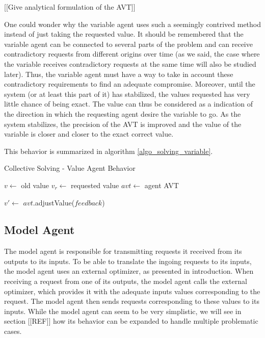 
[[Give analytical formulation of the AVT]]

One could wonder why the variable agent uses such a seemingly contrived method instead of just taking the requested value. It should be remembered that the variable agent can be connected to several parts of the problem and can receive contradictory requests from different origins over time (as we said, the case where the variable receives contradictory requests at the same time will also be studied later). Thus, the variable agent must have a way to take in account these contradictory requirements to find an adequate compromise. Moreover, until the system (or at least this part of it) has stabilized, the values requested has very little chance of being exact. The value can thus be considered as a  indication of the direction in which the requesting agent desire the variable to go. As the system stabilizes, the precision of the AVT is improved and the value of the variable is closer and closer to the exact correct value.

This behavior is summarized in algorithm \ref{algo_solving_variable}.

\begin{algorithm}
\caption{Collective Solving - Value Agent Behavior}
\label{algo_solving_variable}

	$v \leftarrow$ old value\;
	$v_r \leftarrow$ requested value\;
	$avt \leftarrow$ agent AVT \;
	
	$v' \leftarrow$ $avt$.adjustValue($feedback$)\;
	
\end{algorithm}

\subsection{Model Agent}\label{model_agent_solving}

The model agent is responsible for transmitting requests it received from its outputs to its inputs. To be able to translate the ingoing requests to its inputs, the model agent uses an external optimizer, as presented in introduction. When receiving a request from one of its outputs, the model agent calls the external optimizer, which provides it with the adequate inputs values corresponding to the request. The model agent then sends requests corresponding to these values to its inputs.
While the model agent can seem to be very simplistic, we will see in section [[REF]] how its 
behavior can be expanded to handle multiple problematic cases.

